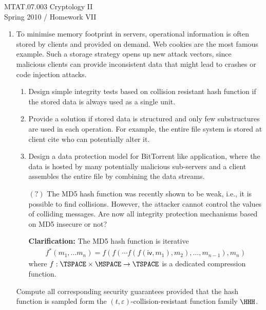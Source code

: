 \documentclass{article}
\begin{document}
\noindent	
MTAT.07.003 Cryptology II\\
Spring 2010 / Homework VII
\begin{enumerate}
\item To minimise memory footprint in servers, operational information
  is often stored by clients and provided on demand. Web cookies are
  the most famous example. Such a storage strategy opens up new attack
  vectors, since malicious clients can provide inconsistent data that
  might lead to crashes or code injection attacks.
  \begin{enumerate}
  \item Design simple integrity tests based on collision resistant
    hash function if the stored data is always used as a single unit.
  \item Provide a solution if stored data is structured and only few
    substructures are used in each operation. For example, the entire
    file system is stored at client cite who can potentially alter it.
  \item Design a data protection model for BitTorrent like
    application, where the data is hosted by many potentially
    malicious sub-servers and a client assembles the entire file by
    combining the data streams.
  \item[$(?)$] The MD5 hash function was recently shown to be weak, i.e., it
    is possible to find collisions. However, the attacker cannot
    control the values of colliding messages. Are now all integrity
    protection mechanisms based on MD5 insecure or not?

    \textbf{Clarification:} The MD5 hash function is iterative
    \begin{align*}
      f^*(m_1,\ldots m_n)=f(f(\cdots
      f(f(\mathsf{iv},m_1),m_2),\ldots,m_{n-1}),m_n)
    \end{align*}
    where $f:\TSPACE\times\MSPACE\to\TSPACE$ is a dedicated
    compression function.
  \end{enumerate}
  Compute all corresponding security guarantees provided that the hash
  function is sampled form the $(t,\varepsilon)$-collision-resistant
  function family $\HHH$.


\end{enumerate}
\end{document}
